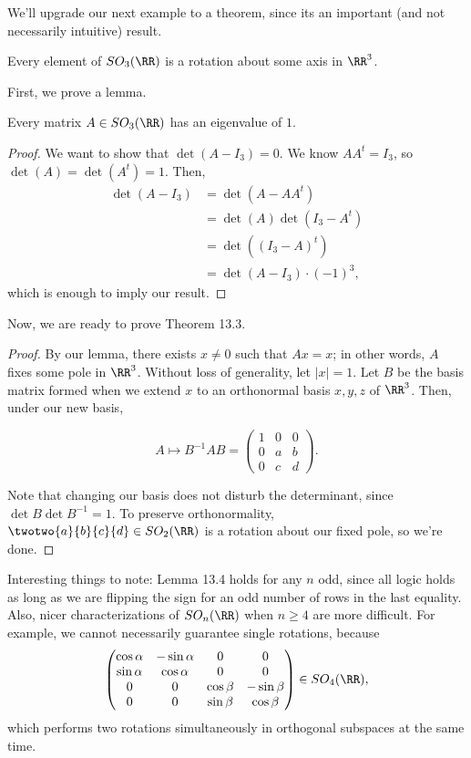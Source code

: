 We'll upgrade our next example to a theorem, since its an important (and not necessarily intuitive) result. 

\begin{theorem}
\thmlabel

Every element of $SO_3(\RR)$ is a rotation about some axis in $\RR^3$.
\end{theorem}

First, we prove a lemma. 

\begin{theorem}
\lemlabel

Every matrix $A\in SO_3(\RR)$ has an eigenvalue of $1$. 
\end{theorem}

\begin{proof}
We want to show that $\det(A-I_3) = 0$. We know $AA^t=I_3$, so $\det(A) = \det(A^t) = 1$. Then, 
\begin{align*}
    \det(A-I_3) &= \det(A-AA^t) \\
    &= \det(A)\det(I_3-A^t) \\
    &= \det((I_3-A)^t) \\
    &= \det(A-I_3)\cdot (-1)^3,
\end{align*}
which is enough to imply our result.
\end{proof}

Now, we are ready to prove Theorem 13.3. 

\begin{proof}
By our lemma, there exists $x\neq 0$ such that $Ax=x$; in other words, $A$ fixes some pole in $\RR^3$. Without loss of generality, let $\vert x\vert = 1$. Let $B$ be the basis matrix formed when we extend $x$ to an orthonormal basis $x,y,z$ of $\RR^3$. Then, under our new basis,

\[A\mapsto B^{-1}AB = \begin{pmatrix}
1 & 0 & 0 \\
0 & a & b \\
0 & c & d
\end{pmatrix}.\]

Note that changing our basis does not disturb the determinant, since $\det B\det B^{-1}=1$. To preserve orthonormality, $\twotwo{a}{b}{c}{d}\in SO_2(\RR)$ is a rotation about our fixed pole, so we're done. 
\end{proof}

Interesting things to note: Lemma 13.4 holds for any $n$ odd, since all logic holds as long as we are flipping the sign for an odd number of rows in the last equality. Also, nicer characterizations of $SO_n(\RR)$ when $n\geq 4$ are more difficult. For example, we cannot necessarily guarantee single rotations, because 
\[\begin{pmatrix}
\cos{\alpha} & -\sin{\alpha} & 0 & 0\\
\sin{\alpha} & \cos{\alpha} & 0 & 0\\
0 & 0 & \cos{\beta} & -\sin{\beta}\\
0 & 0 & \sin{\beta} & \cos{\beta}\\
\end{pmatrix}\in SO_4(\RR),\]
which performs two rotations simultaneously in orthogonal subspaces at the same time.

